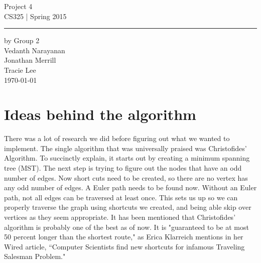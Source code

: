 \documentclass[11pt,letterpaper]{article}
\begin{document}
\begin{titlepage}
    \vspace*{4cm}
    \begin{flushright}
    {\huge
        Project 4\\[5mm]
    }
    {\large
        CS325 | Spring 2015
     }
    \end{flushright}
\hrule
    \begin{flushright}
	by Group 2\\
	Vedanth Narayanan\\
	Jonathan Merrill\\
	Tracie Lee\\
    \vfill
	\today\\
    \end{flushright}
\end{titlepage}

\raggedright

\section*{Ideas behind the algorithm}
There was a lot of research we did before figuring out what we wanted to implement. The single algorithm that was universally praised was Christofides' Algorithm. To succinctly explain, it starts out by creating a minimum spanning tree (MST). The next step is trying to figure out the nodes that have an odd number of edges. Now short cuts need to be created, so there are no vertex has any odd number of edges. A Euler path needs to be found now. Without an Euler path, not all edges can be traversed at least once. This sets us up so we can properly traverse the graph using shortcuts we created, and being able skip over vertices as they seem appropriate. It has been mentioned that Christofides' algorithm is probably one of the best as of now. It is "guaranteed to be at most 50 percent longer than the shortest route," as Erica Klarreich mentions in her Wired article, ``Computer Scientists find new shortcuts for infamous Traveling Salesman Problem."\vspace{8pt}
\end{document}
